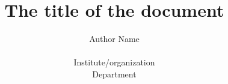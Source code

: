 \documentclass[a4paper,swedish]{report}
\title{
	\Huge{
		The title of the document
	}
}
\author{
	Author Name \\
	\\
	\normalsize{Institute/organization} \\
	\normalsize{Department}
}
\begin{document}
\maketitle
\thispagestyle{empty}
\newpage

\begin{abstract}
%
\end{abstract}

\tableofcontents
\newpage






\appendix
\end{document}
